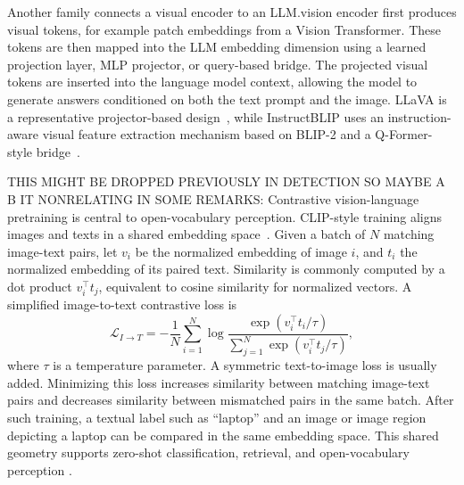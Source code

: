 Another family connects a visual encoder to an LLM.\@A vision encoder first produces visual tokens, for example patch embeddings from a Vision Transformer. These tokens are then mapped into the LLM embedding dimension using a learned projection layer, MLP projector, or query-based bridge. The projected visual tokens are inserted into the language model context, allowing the model to generate answers conditioned on both the text prompt and the image. LLaVA is a representative projector-based design~\cite{liu_visual_2023}, while InstructBLIP uses an instruction-aware visual feature extraction mechanism based on BLIP-2 and a Q-Former-style bridge~\cite{dai_instructblip_2023}.


THIS MIGHT BE DROPPED PREVIOUSLY IN DETECTION SO MAYBE A B IT NONRELATING IN SOME REMARKS: Contrastive vision-language pretraining is central to open-vocabulary perception. CLIP-style training aligns images and texts in a shared embedding space~\cite{pmlr-v139-radford21a}. Given a batch of \(N\) matching image-text pairs, let \(v_i\) be the normalized embedding of image \(i\), and \(t_i\) the normalized embedding of its paired text. Similarity is commonly computed by a dot product \(v_i^\top t_j\), equivalent to cosine similarity for normalized vectors. A simplified image-to-text contrastive loss is
\[
\mathcal{L}_{I\rightarrow T}
=
-\frac{1}{N}\sum_{i=1}^{N}
\log
\frac{\exp(v_i^\top t_i/\tau)}
{\sum_{j=1}^{N}\exp(v_i^\top t_j/\tau)},
\]
where \(\tau\) is a temperature parameter. A symmetric text-to-image loss is usually added. Minimizing this loss increases similarity between matching image-text pairs and decreases similarity between mismatched pairs in the same batch. After such training, a textual label such as \enquote{laptop} and an image or image region depicting a laptop can be compared in the same embedding space. This shared geometry supports zero-shot classification, retrieval, and open-vocabulary perception \cite[14]{zhou_large_2026}.

